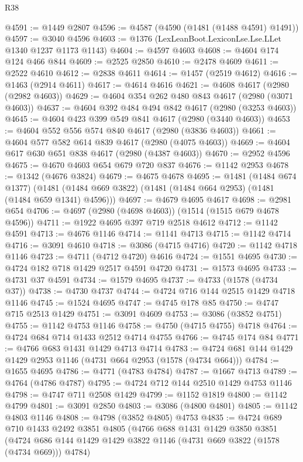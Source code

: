 \begin{lexlean}{R38}
\begin{coremodule}
@4591 := @1449 @2807
@4596 := @4587 (@4590 (@1481 (@1488 @4591) @1491))
@4597 := @3040 @4596
@4603 := @1376 (LexLeanBoot.LexiconLse.Lse.LLet @1340 @1237 @1173 @1143)
@4604 := @4597 @4603
@4608 := @4604 @174 @124 @466 @844
@4609 := @2525 @2850
@4610 := @2478 @4609
@4611 := @2522 @4610
@4612 := @2838 @4611
@4614 := @1457 (@2519 @4612)
@4616 := @1463 (@2914 @4611)
@4617 := @4614 @4616
@4621 := @4608 @4617 (@2980 (@2982 @4603))
@4629 := @4604 @354 @262 @480 @843 @4617 (@2980 (@3071 @4603))
@4637 := @4604 @392 @484 @494 @842 @4617 (@2980 (@3253 @4603))
@4645 := @4604 @423 @399 @549 @841 @4617 (@2980 (@3440 @4603))
@4653 := @4604 @552 @556 @574 @840 @4617 (@2980 (@3836 @4603))
@4661 := @4604 @577 @582 @614 @839 @4617 (@2980 (@4075 @4603))
@4669 := @4604 @617 @630 @651 @838 @4617 (@2980 (@4387 @4603))
@4670 := @2952 @4596
@4675 := @4670 @4603 @654 @679 @720 @837
@4676 := @1142 @2953
@4678 := @1342 (@4676 @3824)
@4679 := @4675 @4678
@4695 := @1481
    (@1484 @674 @1377)
    (@1481 (@1484 @669 @3822) (@1481 (@1484 @664 @2953) (@1481 (@1484 @659 @1341) @4596)))
@4697 := @4679 @4695 @4617
@4698 := @2981 @654
@4706 := @4697 (@2980 (@4698 @4603)) (@1514 (@1515 @679 @4678 @4596))
@4711 := @1922 @4695 @397 @719 @2518 @4612
@4712 := @1142 @4591
@4713 := @4676 @1146
@4714 := @1141 @4713
@4715 := @1142 @4714
@4716 := @3091 @4610
@4718 := @3086 (@4715 @4716)
@4720 := @1142 @4718 @1146
@4723 := @4711 (@4712 @4720) @4616
@4724 := @1551 @4695
@4730 := @4724 @182 @718 @1429 @2517 @4591 @4720
@4731 := @1573 @4695
@4733 := @4731 @37 @4591
@4734 := @1579 @4695
@4737 := @4733 (@1578 (@4734 @37))
@4738 := @4730 @4737
@4744 := @4724 @716 @144 @2515 @1429 @4718 @1146
@4745 := @1524 @4695
@4747 := @4745 @178 @85
@4750 := @4747 @715 @2513 @1429
@4751 := @3091 @4609
@4753 := @3086 (@3852 @4751)
@4755 := @1142 @4753 @1146
@4758 := @4750 (@4715 @4755) @4718
@4764 := @4724 @684 @714 @1433 @2512 @4714 @4755
@4766 := @4745 @174 @84
@4771 := @4766 @683 @1431 @1429 @4713 @4714
@4783 := @4724 @681 @144 @1429 @1429 @2953 @1146 (@4731 @664 @2953 (@1578 (@4734 @664)))
@4784 := @1655 @4695
@4786 := @4771 (@4783 @4784)
@4787 := @1667 @4713
@4789 := @4764 (@4786 @4787)
@4795 := @4724 @712 @144 @2510 @1429 @4753 @1146
@4798 := @4747 @711 @2508 @1429
@4799 := @1152 @1819
@4800 := @1142 @4799
@4801 := @3091 @2850
@4803 := @3086 (@4800 @4801)
@4805 := @1142 @4803 @1146
@4808 := @4798 (@3852 @4805) @4753
@4835 := @4724
    @689
    @710
    @1433
    @2492
    @3851
    @4805
    (@4766
      @688
      @1431
      @1429
      @3850
      @3851
      (@4724 @686 @144 @1429 @1429 @3822 @1146 (@4731 @669 @3822 (@1578 (@4734 @669))) @4784)

\end{coremodule}
\end{lexlean}
